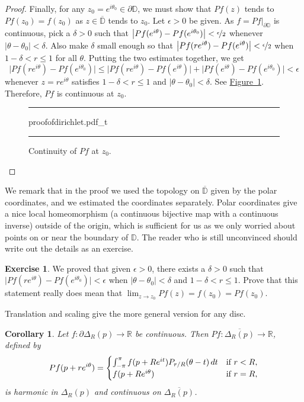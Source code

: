 \documentclass[12pt,openany]{book}
\newcommand{\glsadd}[2][]{}
\newcommand{\avoidbreak}{\postdisplaypenalty=100}
\newcommand{\sabs}[1]{\lvert {#1} \rvert}
\newcommand{\babs}[1]{\bigl\lvert {#1} \bigr\rvert}
\newcommand{\R}{{\mathbb{R}}}
\newcommand{\D}{{\mathbb{D}}}
\theoremstyle{plain}
\newtheorem{cor}[thm]{Corollary}
\theoremstyle{remark}
\theoremstyle{definition}
\newenvironment{exbox}{%
    \def\FrameCommand{\vrule width 1pt \relax\hspace{10pt}}%
    \MakeFramed{\advance\hsize-\width\FrameRestore}%
}{%
    \endMakeFramed
}
\newenvironment{myfig}{%
\begin{figure}[h!t]
\noindent\rule{\textwidth}{0.5pt}\vspace{12pt}\par\centering}%
{\par\noindent\rule{\textwidth}{0.5pt}
\end{figure}}
\theoremstyle{exercise}
\newtheorem{exercise}{Exercise}[section]
\theoremstyle{example}
\newcommand{\figureref}[1]{\hyperref[#1]{Figure~\ref*{#1}}}
\begin{document}
\begin{proof}
Finally, for any $z_0 = e^{i\theta_0} \in \partial \D$,
we must show that
$Pf(z)$ tends to $Pf(z_0)=f(z_0)$ as $z \in \overline{\D}$ tends to $z_0$.
Let $\epsilon > 0$ be given.  As $f = Pf|_{\partial \D}$ is
continuous, pick a $\delta > 0$ such that
$\babs{Pf(e^{i\theta})-Pf(e^{i\theta_0})} < \nicefrac{\epsilon}{2}$
whenever $\sabs{\theta-\theta_0} < \delta$.
Also make $\delta$ small enough so that
$\babs{Pf(re^{i \theta})-Pf(e^{i\theta})} < \nicefrac{\epsilon}{2}$
when $1 - \delta < r \leq 1$ for all $\theta$.
Putting the two estimates together, we get
\begin{equation*}
\babs{Pf(re^{i\theta})-Pf(e^{i\theta_0})}
\leq
\babs{Pf(re^{i\theta})-Pf(e^{i\theta})}
+
\babs{Pf(e^{i\theta})-Pf(e^{i\theta_0})}
< \epsilon
\end{equation*}
whenever $z=re^{i\theta}$ satisfies $1 - \delta < r \leq 1$ and
$\sabs{\theta-\theta_0} < \delta$.
See \figureref{fig:proofofdirichlet}.
Therefore, $Pf$ is
continuous at $z_0$.
\begin{myfig}
{proofofdirichlet.pdf_t}
\caption{Continuity of $Pf$ at $z_0$.\label{fig:proofofdirichlet}}
\end{myfig}
\end{proof}

We remark that in the proof we used the topology on $\overline{\D}$
given by the polar coordinates, and we estimated the coordinates separately.
Polar coordinates give a nice local homeomorphism
(a continuous bijective map with a continuous inverse) outside of
the origin, which is sufficient for us as we only worried about points
on or near the boundary of $\D$.  The reader who is still unconvinced
should write out the details as an exercise.

\begin{exbox}
\begin{exercise}
We proved that given $\epsilon > 0$, there exists a $\delta > 0$ such that
$\babs{Pf(re^{i\theta})-Pf(e^{i\theta_0})} < \epsilon$
when $\sabs{\theta-\theta_0} < \delta$ and
$1 - \delta < r \leq 1$.  Prove that this statement really does mean that
$\lim_{z \to z_0} Pf(z) = f(z_0) = Pf(z_0)$.
\end{exercise}
\end{exbox}

Translation and scaling give the more general version for
any disc.

\begin{cor} \label{cor:dirichsol}
Let $f \colon \partial \Delta_R(p) \to \R$ be continuous.
Then
$Pf \colon \overline{\Delta_R(p)} \to \R$, defined by
\glsadd{not:Pf}%
\begin{equation*}
Pf(p + re^{i\theta})
=
\begin{cases}
\int_{-\pi}^\pi f(p+Re^{it}) P_{r/R}(\theta-t) \, dt
&
\text{if $r < R$,} \\
f(p+Re^{i\theta}) & \text{if $r=R$,}
\end{cases}
\avoidbreak
\end{equation*}
is harmonic in $\Delta_R(p)$ and continuous on $\overline{\Delta_R(p)}$.
\end{cor}
\end{document}
